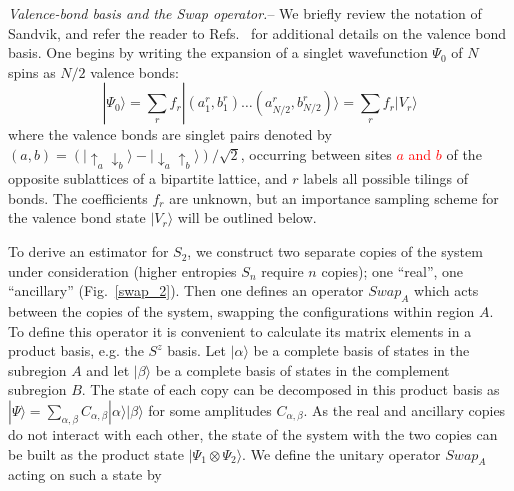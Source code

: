 \documentclass[prl,aps,twocolumn,floatfix,amsmath,amssymb,superscriptaddress,tightenlines]{revtex4}
\begin{document}
{\it Valence-bond basis and the Swap operator.}-- We briefly review the notation of Sandvik, and refer the reader to 
Refs.~\cite{Sandvik,Beach,AWSloop} for additional details on the valence bond basis.
One begins by writing the expansion of a singlet
wavefunction $\Psi_0$ of $N$ spins as $N/2$ valence bonds:
\begin{equation}
| \Psi_0 \rangle = \sum_r f_r|(a^r_1,b^r_1) \ldots (a^r_{N/2},b^r_{N/2}) \rangle = \sum_r f_r| V_r \rangle
\end{equation}
where the valence bonds are singlet pairs denoted by $(a,b) = (\lvert\uparrow_a \downarrow_b \rangle - \lvert\downarrow_a \uparrow_b\rangle)/\sqrt{2}$,
occurring between sites \textcolor{red}{$a$ and $b$} of the opposite sublattices of a bipartite lattice, and $r$ labels all possible tilings of bonds.  The coefficients $f_r$ are unknown, but an importance sampling scheme \cite{Sandvik} for the valence bond state $| V_r \rangle$ will be outlined below.  

%
%
To derive an estimator for $S_2$, we construct two separate copies of the
system under consideration (higher entropies $S_n$ require $n$ copies);
one ``real'', one ``ancillary'' (Fig.~\ref{swap_2}). Then one defines an
operator $Swap_A$ which acts between the copies of the system, swapping
the configurations within region $A$.  To define this operator it is
convenient to calculate its matrix elements in a product basis, e.g.  the
$S^z$ basis.  Let $|\alpha\rangle$  be a complete basis of states in the
subregion $A$ and let $|\beta\rangle$ be a complete basis of states in the
complement subregion $B$. The state of each copy can be decomposed
in this product basis as $|\Psi\rangle=\sum_{\alpha,\beta} C_{\alpha,\beta}
|\alpha\rangle | \beta \rangle$ for some amplitudes $C_{\alpha,\beta}$. As
the real and ancillary copies do not interact with each other, the state
of the system with the two copies can be built as the product state
$|\Psi_1 \otimes \Psi_2\rangle$. We define the unitary operator $Swap_A$
acting on such a state by
\end{document}

